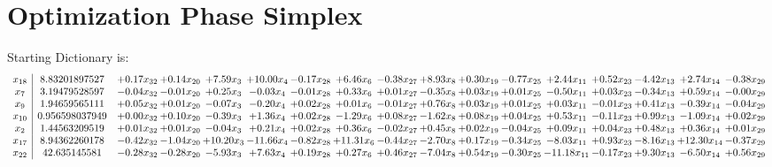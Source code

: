 \documentclass[9pt]{article}
\begin{document}
\section{Optimization Phase Simplex}
Starting Dictionary is:
\[\begin{array}{c| c c@{\hskip 2pt} c@{\hskip 2pt} c@{\hskip 2pt} c@{\hskip 2pt} c@{\hskip 2pt} c@{\hskip 2pt} c@{\hskip 2pt} c@{\hskip 2pt} c@{\hskip 2pt} c@{\hskip 2pt} c@{\hskip 2pt} c@{\hskip 2pt} c@{\hskip 2pt} c@{\hskip 2pt} c@{\hskip 2pt} }
 x_{18}   &  8.83201897527 & +  0.17 x_{32} & +  0.14 x_{20} & +  7.59 x_{3} & + 10.00 x_{4} & -0.17 x_{28} & +  6.46 x_{6} & -0.38 x_{27} & +  8.93 x_{8} & +  0.30 x_{19} & -0.77 x_{25} & +  2.44 x_{11} & +  0.52 x_{23} & -4.42 x_{13} & +  2.74 x_{14} & -0.38 x_{29}\\
 x_{7}   &  3.19479528597 & -0.04 x_{32} & -0.01 x_{20} & +  0.25 x_{3} & -0.03 x_{4} & -0.01 x_{28} & +  0.33 x_{6} & +  0.01 x_{27} & -0.35 x_{8} & +  0.03 x_{19} & +  0.01 x_{25} & -0.50 x_{11} & +  0.03 x_{23} & -0.34 x_{13} & +  0.59 x_{14} & -0.00 x_{29}\\
 x_{9}   &  1.94659565111 & +  0.05 x_{32} & +  0.01 x_{20} & -0.07 x_{3} & -0.20 x_{4} & +  0.02 x_{28} & +  0.01 x_{6} & -0.01 x_{27} & +  0.76 x_{8} & +  0.03 x_{19} & +  0.01 x_{25} & +  0.03 x_{11} & -0.01 x_{23} & +  0.41 x_{13} & -0.39 x_{14} & -0.04 x_{29}\\
 x_{10}   &  0.956598037949 & +  0.00 x_{32} & +  0.10 x_{20} & -0.39 x_{3} & +  1.36 x_{4} & +  0.02 x_{28} & -1.29 x_{6} & +  0.08 x_{27} & -1.62 x_{8} & +  0.08 x_{19} & +  0.04 x_{25} & +  0.53 x_{11} & -0.11 x_{23} & +  0.99 x_{13} & -1.09 x_{14} & +  0.02 x_{29}\\
 x_{2}   &  1.44563209519 & +  0.01 x_{32} & +  0.01 x_{20} & -0.04 x_{3} & +  0.21 x_{4} & +  0.02 x_{28} & +  0.36 x_{6} & -0.02 x_{27} & +  0.45 x_{8} & +  0.02 x_{19} & -0.04 x_{25} & +  0.09 x_{11} & +  0.04 x_{23} & +  0.48 x_{13} & +  0.36 x_{14} & +  0.01 x_{29}\\
 x_{17}   &  8.94362260178 & -0.42 x_{32} & -1.04 x_{20} & + 10.20 x_{3} & -11.66 x_{4} & -0.82 x_{28} & + 11.31 x_{6} & -0.44 x_{27} & -2.70 x_{8} & +  0.17 x_{19} & -0.34 x_{25} & -8.03 x_{11} & +  0.93 x_{23} & -8.16 x_{13} & + 12.30 x_{14} & -0.37 x_{29}\\
 x_{22}   &  42.635145581 & -0.28 x_{32} & -0.28 x_{20} & -5.93 x_{3} & +  7.63 x_{4} & +  0.19 x_{28} & +  0.27 x_{6} & +  0.46 x_{27} & -7.04 x_{8} & +  0.54 x_{19} & -0.30 x_{25} & -11.18 x_{11} & -0.17 x_{23} & +  9.30 x_{13} & -6.50 x_{14} & +  0.56 x_{29}\\

\end{array}\]
\end{document}
